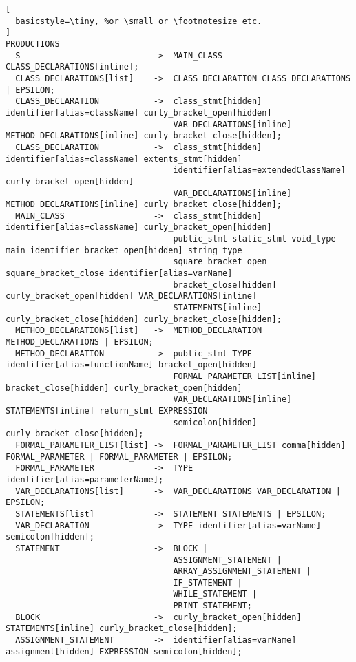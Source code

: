 \begin{lstlisting}[
  basicstyle=\tiny, %or \small or \footnotesize etc.
]
PRODUCTIONS
  S                           ->  MAIN_CLASS CLASS_DECLARATIONS[inline];
  CLASS_DECLARATIONS[list]    ->  CLASS_DECLARATION CLASS_DECLARATIONS | EPSILON;
  CLASS_DECLARATION           ->  class_stmt[hidden] identifier[alias=className] curly_bracket_open[hidden] 
                                  VAR_DECLARATIONS[inline] METHOD_DECLARATIONS[inline] curly_bracket_close[hidden];
  CLASS_DECLARATION           ->  class_stmt[hidden] identifier[alias=className] extents_stmt[hidden] 
                                  identifier[alias=extendedClassName] curly_bracket_open[hidden] 
                                  VAR_DECLARATIONS[inline] METHOD_DECLARATIONS[inline] curly_bracket_close[hidden];
  MAIN_CLASS                  ->  class_stmt[hidden] identifier[alias=className] curly_bracket_open[hidden] 
                                  public_stmt static_stmt void_type main_identifier bracket_open[hidden] string_type 
                                  square_bracket_open square_bracket_close identifier[alias=varName] 
                                  bracket_close[hidden] curly_bracket_open[hidden] VAR_DECLARATIONS[inline] 
                                  STATEMENTS[inline] curly_bracket_close[hidden] curly_bracket_close[hidden];
  METHOD_DECLARATIONS[list]   ->  METHOD_DECLARATION METHOD_DECLARATIONS | EPSILON;
  METHOD_DECLARATION          ->  public_stmt TYPE identifier[alias=functionName] bracket_open[hidden] 
                                  FORMAL_PARAMETER_LIST[inline] bracket_close[hidden] curly_bracket_open[hidden] 
                                  VAR_DECLARATIONS[inline] STATEMENTS[inline] return_stmt EXPRESSION 
                                  semicolon[hidden] curly_bracket_close[hidden];
  FORMAL_PARAMETER_LIST[list] ->  FORMAL_PARAMETER_LIST comma[hidden] FORMAL_PARAMETER | FORMAL_PARAMETER | EPSILON;
  FORMAL_PARAMETER            ->  TYPE identifier[alias=parameterName];
  VAR_DECLARATIONS[list]      ->  VAR_DECLARATIONS VAR_DECLARATION | EPSILON;
  STATEMENTS[list]            ->  STATEMENT STATEMENTS | EPSILON;
  VAR_DECLARATION             ->  TYPE identifier[alias=varName] semicolon[hidden];
  STATEMENT                   ->  BLOCK | 
                                  ASSIGNMENT_STATEMENT | 
                                  ARRAY_ASSIGNMENT_STATEMENT | 
                                  IF_STATEMENT | 
                                  WHILE_STATEMENT | 
                                  PRINT_STATEMENT;
  BLOCK                       ->  curly_bracket_open[hidden] STATEMENTS[inline] curly_bracket_close[hidden];
  ASSIGNMENT_STATEMENT        ->  identifier[alias=varName] assignment[hidden] EXPRESSION semicolon[hidden];

\end{lstlisting}
